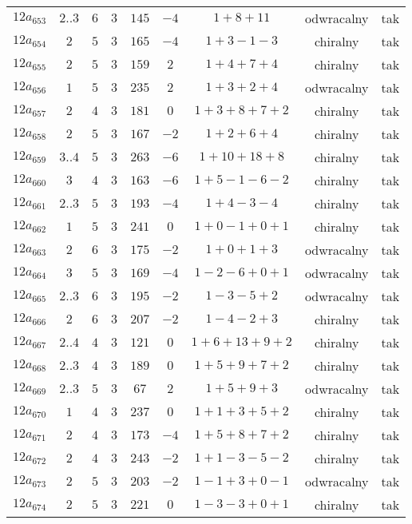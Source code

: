 \begin{longtable}{ccccccccc}
$12a_{653}$ & $2..3$ & $6$ & $3$ & $145$ & $-4$ & $1+8+11$ & odwracalny & tak \\
$12a_{654}$ & $2$ & $5$ & $3$ & $165$ & $-4$ & $1+3-1-3$ & chiralny & tak \\
$12a_{655}$ & $2$ & $5$ & $3$ & $159$ & $2$ & $1+4+7+4$ & chiralny & tak \\
$12a_{656}$ & $1$ & $5$ & $3$ & $235$ & $2$ & $1+3+2+4$ & odwracalny & tak \\
$12a_{657}$ & $2$ & $4$ & $3$ & $181$ & $0$ & $1+3+8+7+2$ & chiralny & tak \\
$12a_{658}$ & $2$ & $5$ & $3$ & $167$ & $-2$ & $1+2+6+4$ & chiralny & tak \\
$12a_{659}$ & $3..4$ & $5$ & $3$ & $263$ & $-6$ & $1+10+18+8$ & chiralny & tak \\
$12a_{660}$ & $3$ & $4$ & $3$ & $163$ & $-6$ & $1+5-1-6-2$ & chiralny & tak \\
$12a_{661}$ & $2..3$ & $5$ & $3$ & $193$ & $-4$ & $1+4-3-4$ & chiralny & tak \\
$12a_{662}$ & $1$ & $5$ & $3$ & $241$ & $0$ & $1+0-1+0+1$ & chiralny & tak \\
$12a_{663}$ & $2$ & $6$ & $3$ & $175$ & $-2$ & $1+0+1+3$ & odwracalny & tak \\
$12a_{664}$ & $3$ & $5$ & $3$ & $169$ & $-4$ & $1-2-6+0+1$ & odwracalny & tak \\
$12a_{665}$ & $2..3$ & $6$ & $3$ & $195$ & $-2$ & $1-3-5+2$ & odwracalny & tak \\
$12a_{666}$ & $2$ & $6$ & $3$ & $207$ & $-2$ & $1-4-2+3$ & chiralny & tak \\
$12a_{667}$ & $2..4$ & $4$ & $3$ & $121$ & $0$ & $1+6+13+9+2$ & chiralny & tak \\
$12a_{668}$ & $2..3$ & $4$ & $3$ & $189$ & $0$ & $1+5+9+7+2$ & chiralny & tak \\
$12a_{669}$ & $2..3$ & $5$ & $3$ & $67$ & $2$ & $1+5+9+3$ & odwracalny & tak \\
$12a_{670}$ & $1$ & $4$ & $3$ & $237$ & $0$ & $1+1+3+5+2$ & chiralny & tak \\
$12a_{671}$ & $2$ & $4$ & $3$ & $173$ & $-4$ & $1+5+8+7+2$ & chiralny & tak \\
$12a_{672}$ & $2$ & $4$ & $3$ & $243$ & $-2$ & $1+1-3-5-2$ & chiralny & tak \\
$12a_{673}$ & $2$ & $5$ & $3$ & $203$ & $-2$ & $1-1+3+0-1$ & odwracalny & tak \\
$12a_{674}$ & $2$ & $5$ & $3$ & $221$ & $0$ & $1-3-3+0+1$ & chiralny & tak \\

\end{longtable}
